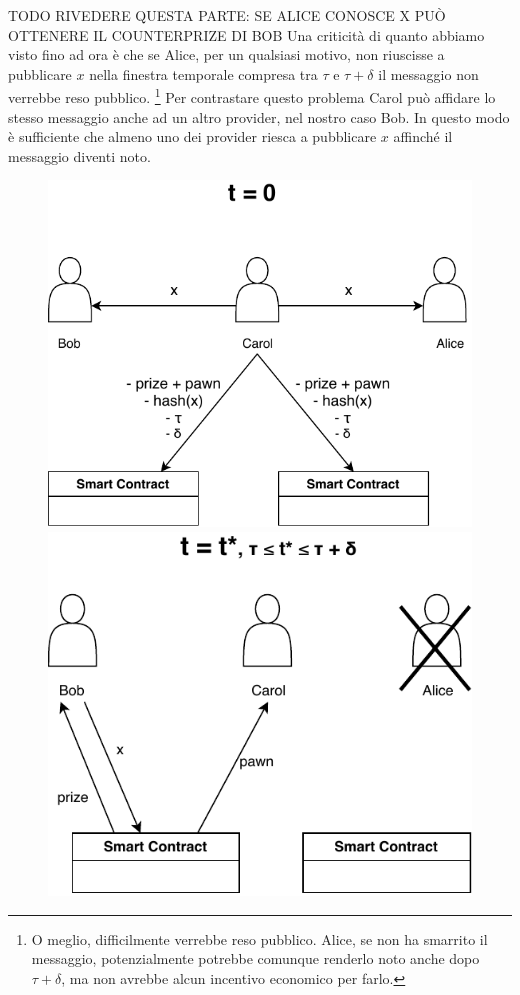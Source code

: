 TODO RIVEDERE QUESTA PARTE: SE ALICE CONOSCE X PUÒ OTTENERE IL COUNTERPRIZE DI BOB
Una criticità di quanto abbiamo visto fino ad ora è che se Alice, per 
un qualsiasi motivo,
non riuscisse a pubblicare $ x $ nella finestra temporale compresa tra $ \tau $ e 
$ \tau + \delta $ il messaggio non verrebbe reso pubblico.
\footnote{O meglio, difficilmente verrebbe reso pubblico. Alice, se non ha smarrito
il messaggio, potenzialmente potrebbe
comunque renderlo noto anche dopo $ \tau + \delta $, ma non avrebbe alcun 
incentivo economico per farlo.}
Per contrastare questo
problema Carol può affidare lo stesso messaggio anche ad un altro provider, nel nostro
caso Bob.
In questo modo è sufficiente che almeno uno dei provider riesca a pubblicare $ x $ 
affinché il messaggio diventi noto.
\begin{figure}[H]
	\begin{minipage}{0.5\textwidth}
		\centering
		\includegraphics[width=.9\linewidth]{images/chap_protocollo/base-ridondanza-1.pdf}
		\caption{}
	\end{minipage}\hfill
	\begin{minipage}{0.5\textwidth}
		\centering
		\includegraphics[width=.9\linewidth]{images/chap_protocollo/base-ridondanza-2.pdf}
		\caption{}
	\end{minipage}
\end{figure}
